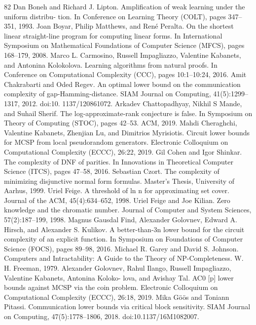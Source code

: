 \begin{thebibliography}{82}
Dan Boneh and Richard J. Lipton. Amplification of weak learning under the uniform distribu- tion. In Conference on Learning Theory (COLT), pages 347–351, 1993.
Joan Boyar, Philip Matthews, and René Peralta. On the shortest linear straight-line program for computing linear forms. In International Symposium on Mathematical Foundations of Computer Science (MFCS), pages 168–179, 2008.
Marco L. Carmosino, Russell Impagliazzo, Valentine Kabanets, and Antonina Kolokolova. Learning algorithms from natural proofs. In Conference on Computational Complexity (CCC), pages 10:1–10:24, 2016.
Amit Chakrabarti and Oded Regev. An optimal lower bound on the communication complexity of gap-Hamming-distance. SIAM Journal on Computing, 41(5):1299–1317, 2012. doi:10. 1137/120861072.
Arkadev Chattopadhyay, Nikhil S Mande, and Suhail Sherif. The log-approximate-rank conjecture is false. In Symposium on Theory of Computing (STOC), pages 42–53. ACM, 2019.
Mahdi Cheraghchi, Valentine Kabanets, Zhenjian Lu, and Dimitrios Myrisiotis. Circuit lower bounds for MCSP from local pseudorandom generators. Electronic Colloquium on Computational Complexity (ECCC), 26:22, 2019.
Gil Cohen and Igor Shinkar. The complexity of DNF of parities. In Innovations in Theoretical Computer Science (ITCS), pages 47–58, 2016.
Sebastian Czort. The complexity of minimizing disjunctive normal form formulas. Master’s Thesis, University of Aarhus, 1999.
Uriel Feige. A threshold of ln n for approximating set cover. Journal of the ACM, 45(4):634–652, 1998.
Uriel Feige and Joe Kilian. Zero knowledge and the chromatic number. Journal of Computer and System Sciences, 57(2):187–199, 1998.
Magnus Gausdal Find, Alexander Golovnev, Edward A. Hirsch, and Alexander S. Kulikov. A better-than-3n lower bound for the circuit complexity of an explicit function. In Symposium on Foundations of Computer Science (FOCS), pages 89–98, 2016.
Michael R. Garey and David S. Johnson. Computers and Intractability: A Guide to the Theory of NP-Completeness. W. H. Freeman, 1979.
Alexander Golovnev, Rahul Ilango, Russell Impagliazzo, Valentine Kabanets, Antonina Koloko- lova, and Avishay Tal. AC0 [p] lower bounds against MCSP via the coin problem. Electronic Colloquium on Computational Complexity (ECCC), 26:18, 2019.
Mika Göös and Toniann Pitassi. Communication lower bounds via critical block sensitivity. SIAM Journal on Computing, 47(5):1778–1806, 2018. doi:10.1137/16M1082007.

\end{thebibliography}
